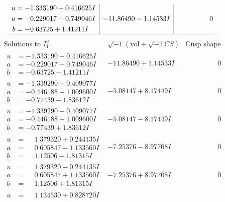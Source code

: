 \documentclass[1p]{elsarticle_modified}
\theoremstyle{definition}
\newcommand{\I}{\sqrt{-1}}
\begin{document}
$$\begin{array}{c|c|c}
\begin{aligned}
u &= -1.333190 + 0.416625 I \\
a &= -0.229017 + 0.749046 I \\
b &= -0.63725 + 1.41211 I\end{aligned}
 & -11.86490 - 1.14533 I & \phantom{-0.000000 } 0\\
 \hline 
 \end{array}$$\newpage$$\begin{array}{c|c|c}  
\text{Solutions to }I^u_{1}& \I (\text{vol} + \sqrt{-1}CS) & \text{Cusp shape}\\
 \hline 
\begin{aligned}
u &= -1.333190 - 0.416625 I \\
a &= -0.229017 - 0.749046 I \\
b &= -0.63725 - 1.41211 I\end{aligned}
 & -11.86490 + 1.14533 I & \phantom{-0.000000 } 0 \\ \hline\begin{aligned}
u &= -1.339290 + 0.409077 I \\
a &= -0.446188 - 1.009600 I \\
b &= -0.77439 - 1.83612 I\end{aligned}
 & -5.08147 + 8.17449 I & \phantom{-0.000000 } 0 \\ \hline\begin{aligned}
u &= -1.339290 - 0.409077 I \\
a &= -0.446188 + 1.009600 I \\
b &= -0.77439 + 1.83612 I\end{aligned}
 & -5.08147 - 8.17449 I & \phantom{-0.000000 } 0 \\ \hline\begin{aligned}
u &= \phantom{-}1.379320 + 0.244135 I \\
a &= \phantom{-}0.605847 - 1.133560 I \\
b &= \phantom{-}1.12506 - 1.81315 I\end{aligned}
 & -7.25376 - 8.97708 I & \phantom{-0.000000 } 0 \\ \hline\begin{aligned}
u &= \phantom{-}1.379320 - 0.244135 I \\
a &= \phantom{-}0.605847 + 1.133560 I \\
b &= \phantom{-}1.12506 + 1.81315 I\end{aligned}
 & -7.25376 + 8.97708 I & \phantom{-0.000000 } 0 \\ \hline\begin{aligned}
u &= \phantom{-}1.134530 + 0.828720 I \\

\end{aligned}
\end{array}$$
\end{document}

